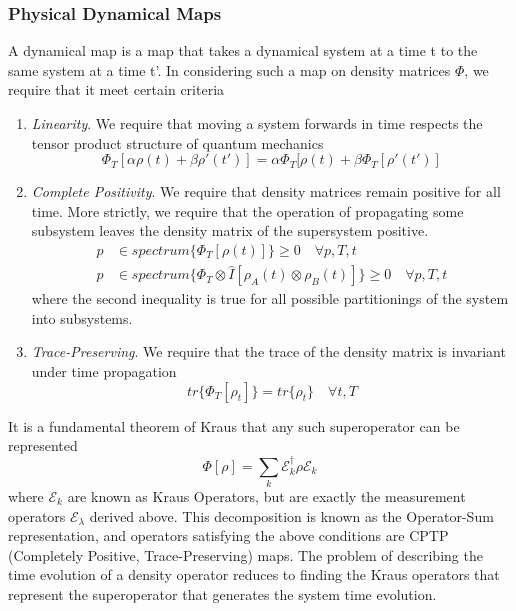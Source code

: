  \subsubsection{Physical Dynamical Maps}
A dynamical map is a map that takes a dynamical system at a time t to the same system at a time t'. In considering such a map on density matrices $\Phi$, we require that it meet certain criteria
\begin{enumerate}
    \item \emph{Linearity}. We require that moving a system forwards in time respects the tensor product structure of quantum mechanics
        \begin{equation}
            \Phi_T[\alpha\rho(t) + \beta\rho'(t')] = \alpha \Phi_T[\rho(t) + \beta \Phi_T[\rho'(t')]
        \end{equation}
    \item \emph{Complete Positivity}. We require that density matrices remain positive for all time. More strictly, we require that the operation of propagating some subsystem leaves the density matrix of the supersystem positive.
        \begin{align}
            p & \in  spectrum \{\Phi_T[\rho(t)]\} \geq  0\quad \forall p, T, t\\
            p & \in  spectrum \{\Phi_T \otimes \hat{I} [\rho_A(t) \otimes\rho_B(t) ] \} \geq 0 \quad \forall p, T, t
        \end{align}
        where the second inequality is true for all possible partitionings of the system into subsystems.
    \item \emph{Trace-Preserving}. We require that the trace of the density matrix is invariant under time propagation
        \begin{equation}
            tr\{ \Phi_T[\rho_t] \} = tr \{ \rho_t \} \quad \forall t, T
        \end{equation}
\end{enumerate}
It is a fundamental theorem of Kraus \cite{Kraus1983} that any such superoperator can be represented\cite{Nielsen2010}
\begin{equation}
    \Phi[\rho] = \sum_k \mathscr{E}_k^\dagger \rho \mathscr{E}_k
\end{equation}
where $\mathscr{E}_k $ are known as Kraus Operators, but are exactly the measurement operators $\mathscr{E}_\lambda$ derived above. This decomposition is known as the Operator-Sum representation\cite{Nielsen2010}, and operators satisfying the above conditions are CPTP (Completely Positive, Trace-Preserving) maps. The problem of describing the time evolution of a density operator reduces to finding the Kraus operators that represent the superoperator that generates the system time evolution.

